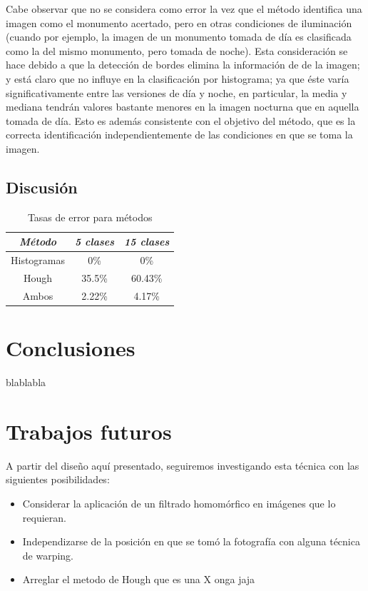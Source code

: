 \documentclass[conference,spanish,a4paper,10pt,oneside,final]{tfmpd}
\begin{document}
Cabe observar que no se considera como error la vez que el método identifica
una imagen como el monumento acertado, pero en otras
condiciones de iluminación (cuando por ejemplo, la imagen de un monumento
tomada de día es clasificada como la del mismo monumento, pero tomada de noche).
Esta consideración se hace debido a que la detección de bordes elimina la
información de   de la imagen; y está claro que no influye
en la clasificación por histograma; ya que éste varía significativamente
entre las versiones de día y noche, en particular, la media y mediana tendrán
valores bastante menores en la imagen nocturna que en aquella tomada de día.
Esto es además consistente con el objetivo del método, que es la correcta
identificación independientemente de las condiciones en que se toma la imagen.

%
%
%
%
\subsection{Discusión}

\begin{table}
\caption{Tasas de error para métodos}
\begin{center}
\begin{tabular}{ccc}
\hline \emph{Método} & \emph{5 clases} & \emph{15 clases}\\ 
\hline Histogramas & 0\% & 0\%\\ 
\hline Hough & 35.5\% & 60.43\%\\ 
\hline Ambos & 2.22\% & 4.17\%\\ 
\hline 
\end{tabular} 
\end{center}
\end{table}
%
%
%
%
\section{Conclusiones}
blablabla
%
%
%
%
\section{Trabajos futuros}
A partir del diseño aquí presentado, seguiremos investigando esta técnica con las siguientes
posibilidades:
\begin{itemize}
\item Considerar la aplicación de un filtrado homomórfico en imágenes que lo requieran.
\item Independizarse de la posición en que se tomó la fotografía con alguna técnica de warping.
\item Arreglar el metodo de Hough que es una X onga jaja\end{itemize}

\nocite{*}


\end{document}
